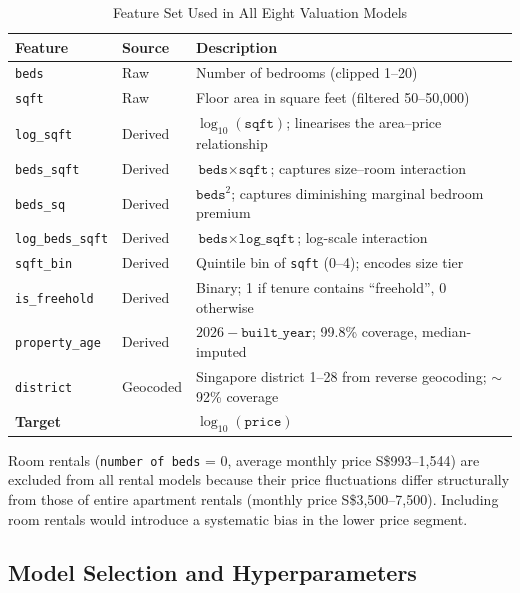\begin{table}[!ht]
    \centering
    \small
    \caption{Feature Set Used in All Eight Valuation Models}
    \label{tab:features_design}
    \renewcommand{\arraystretch}{1.25}
    \begin{tabular}{@{}llp{6.5cm}@{}}
    \toprule
    \textbf{Feature} & \textbf{Source} & \textbf{Description} \\ \midrule
    \texttt{beds}           & Raw       & Number of bedrooms (clipped 1--20) \\
    \texttt{sqft}           & Raw       & Floor area in square feet (filtered 50--50,000) \\
    \texttt{log\_sqft}      & Derived   & $\log_{10}(\texttt{sqft})$; linearises the area--price relationship \\
    \texttt{beds\_sqft}     & Derived   & $\texttt{beds} \times \texttt{sqft}$; captures size--room interaction \\
    \texttt{beds\_sq}       & Derived   & $\texttt{beds}^2$; captures diminishing marginal bedroom premium \\
    \texttt{log\_beds\_sqft}& Derived   & $\texttt{beds} \times \texttt{log\_sqft}$; log-scale interaction \\
    \texttt{sqft\_bin}      & Derived   & Quintile bin of \texttt{sqft} (0--4); encodes size tier \\
    \texttt{is\_freehold}   & Derived   & Binary; 1 if tenure contains ``freehold'', 0 otherwise \\
    \texttt{property\_age}  & Derived   & $2026 - \texttt{built\_year}$; 99.8\% coverage, median-imputed \\
    \texttt{district}       & Geocoded  & Singapore district 1--28 from reverse geocoding; $\sim$92\% coverage \\
    \midrule
    \textbf{Target} & & $\log_{10}(\texttt{price})$ \\
    \bottomrule
    \end{tabular}
\end{table}

Room rentals (\texttt{number of beds} = 0, average monthly price S\$993--1,544) are excluded from all rental models because their price fluctuations differ structurally from those of entire apartment rentals (monthly price S\$3,500--7,500). Including room rentals would introduce a systematic bias in the lower price segment.

\subsection{Model Selection and Hyperparameters}

